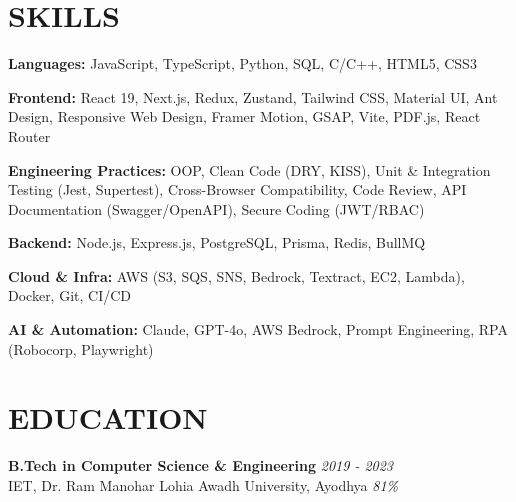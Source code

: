 \documentclass[a4paper,10pt]{article}
\begin{document}
\vspace{3pt}

\section{SKILLS}

\textbf{Languages:} JavaScript, TypeScript, Python, SQL, C/C++, HTML5, CSS3

\textbf{Frontend:} React 19, Next.js, Redux, Zustand, Tailwind CSS, Material UI, Ant Design, Responsive Web Design, Framer Motion, GSAP, Vite, PDF.js, React Router

\textbf{Engineering Practices:} OOP, Clean Code (DRY, KISS), Unit \& Integration Testing (Jest, Supertest), Cross-Browser Compatibility, Code Review, API Documentation (Swagger/OpenAPI), Secure Coding (JWT/RBAC)

\textbf{Backend:} Node.js, Express.js, PostgreSQL, Prisma, Redis, BullMQ

\textbf{Cloud \& Infra:} AWS (S3, SQS, SNS, Bedrock, Textract, EC2, Lambda), Docker, Git, CI/CD

\textbf{AI \& Automation:} Claude, GPT-4o, AWS Bedrock, Prompt Engineering, RPA (Robocorp, Playwright)

\vspace{3pt}

\section{EDUCATION}

\textbf{B.Tech in Computer Science \& Engineering} \hfill \textit{2019 - 2023}\\
IET, Dr. Ram Manohar Lohia Awadh University, Ayodhya \hfill \textit{81\%}
\end{document}
